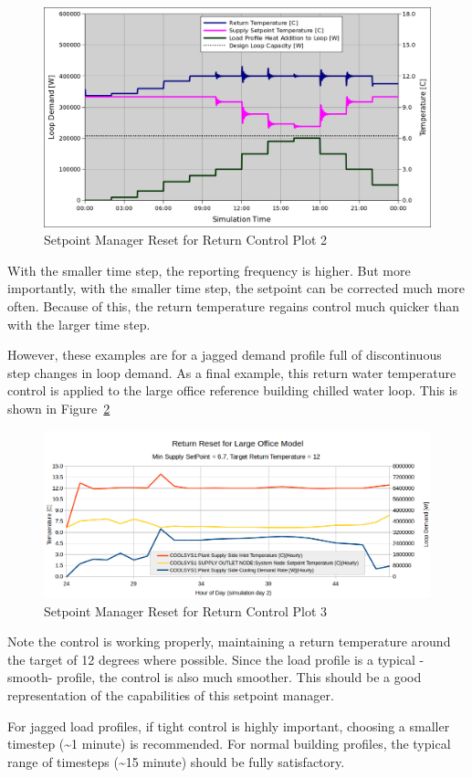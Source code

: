 \begin{figure}[htbp]
\centering
\includegraphics{media/SetPointManager-ResetForReturnControl2.png}
\caption{Setpoint Manager Reset for Return Control Plot 2 \protect \label{fig:key-control-plot2}}
\end{figure}

With the smaller time step, the reporting frequency is higher. But more importantly, with the smaller time step, the setpoint can be corrected much more often. Because of this, the return temperature regains control much quicker than with the larger time step.

However, these examples are for a jagged demand profile full of discontinuous step changes in loop demand. As a final example, this return water temperature control is applied to the large office reference building chilled water loop. This is shown in Figure~\ref{fig:key-control-plot3}

\begin{figure}[htbp]
\centering
\includegraphics{media/SetPointManager-ResetForReturnControl3.png}
\caption{Setpoint Manager Reset for Return Control Plot 3 \protect \label{fig:key-control-plot3}}
\end{figure}

Note the control is working properly, maintaining a return temperature around the target of 12 degrees where possible. Since the load profile is a typical -smooth- profile, the control is also much smoother. This should be a good representation of the capabilities of this setpoint manager.

For jagged load profiles, if tight control is highly important, choosing a smaller timestep (\textasciitilde{}1 minute) is recommended. For normal building profiles, the typical range of timesteps (\textasciitilde{}15 minute) should be fully satisfactory.
